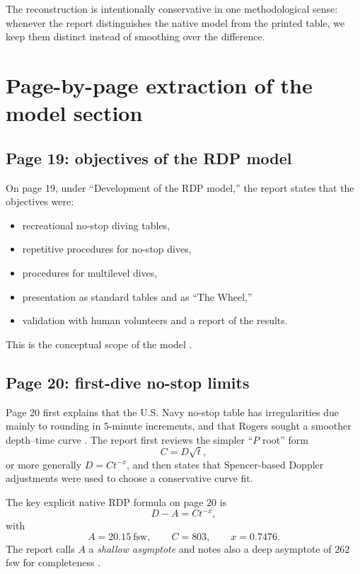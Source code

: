 \documentclass[11pt]{article}
\begin{document}
The reconstruction is intentionally conservative in one methodological sense: whenever the report distinguishes the native model from the printed table, we keep them distinct instead of smoothing over the difference.

\section{Page-by-page extraction of the model section}

\subsection{Page 19: objectives of the RDP model}

On page 19, under ``Development of the RDP model,'' the report states that the objectives were:
\begin{itemize}
\item recreational no-stop diving tables,
\item repetitive procedures for no-stop dives,
\item procedures for multilevel dives,
\item presentation as standard tables and as ``The Wheel,''
\item validation with human volunteers and a report of the results.
\end{itemize}
This is the conceptual scope of the model \cite[p.~19]{Hamilton1994}.

\subsection{Page 20: first-dive no-stop limits}

Page 20 first explains that the U.S. Navy no-stop table has irregularities due mainly to rounding in $5$-minute increments, and that Rogers sought a smoother depth--time curve \cite[p.~20]{Hamilton1994}. The report first reviews the simpler ``$P$ root'' form
\[
C = D \sqrt{t},
\]
or more generally $D = C t^{-x}$, and then states that Spencer-based Doppler adjustments were used to choose a conservative curve fit.

The key explicit native RDP formula on page 20 is
\begin{equation}
D - A = C t^{-x},
\label{eq:DSATcurve}
\end{equation}
with
\[
A = 20.15\ \text{fsw}, \qquad C = 803, \qquad x = 0.7476.
\]
The report calls $A$ a \emph{shallow asymptote} and notes also a deep asymptote of $262$ fsw for completeness \cite[p.~20]{Hamilton1994}.
\end{document}
